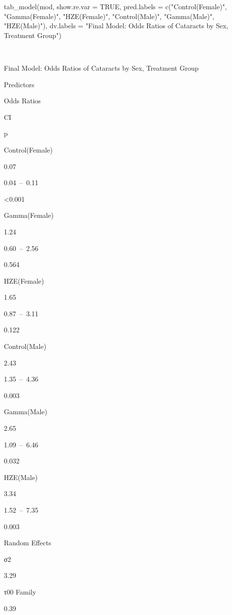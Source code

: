 \documentclass[
]{article}
\newenvironment{Shaded}{\begin{snugshade}}{\end{snugshade}}
\newcommand{\AttributeTok}[1]{\textcolor[rgb]{0.77,0.63,0.00}{#1}}
\newcommand{\ConstantTok}[1]{\textcolor[rgb]{0.00,0.00,0.00}{#1}}
\newcommand{\FunctionTok}[1]{\textcolor[rgb]{0.00,0.00,0.00}{#1}}
\newcommand{\NormalTok}[1]{#1}
\newcommand{\StringTok}[1]{\textcolor[rgb]{0.31,0.60,0.02}{#1}}
\begin{document}
\begin{Shaded}
\begin{Highlighting}[]
\FunctionTok{tab\_model}\NormalTok{(mod, }\AttributeTok{show.re.var =} \ConstantTok{TRUE}\NormalTok{,}
          \AttributeTok{pred.labels =} \FunctionTok{c}\NormalTok{(}\StringTok{"Control(Female)"}\NormalTok{, }\StringTok{"Gamma(Female)"}\NormalTok{, }\StringTok{"HZE(Female)"}\NormalTok{,}
                          \StringTok{"Control(Male)"}\NormalTok{, }\StringTok{"Gamma(Male)"}\NormalTok{, }\StringTok{"HZE(Male)"}\NormalTok{),}
          \AttributeTok{dv.labels =} \StringTok{"Final Model: Odds Ratios of Cataracts by Sex, Treatment Group"}\NormalTok{)}
\end{Highlighting}
\end{Shaded}

~

Final Model: Odds Ratios of Cataracts by Sex, Treatment Group

Predictors

Odds Ratios

CI

p

Control(Female)

0.07

0.04~--~0.11

\textless0.001

Gamma(Female)

1.24

0.60~--~2.56

0.564

HZE(Female)

1.65

0.87~--~3.11

0.122

Control(Male)

2.43

1.35~--~4.36

0.003

Gamma(Male)

2.65

1.09~--~6.46

0.032

HZE(Male)

3.34

1.52~--~7.35

0.003

Random Effects

σ2

3.29

τ00 Family

0.39
\end{document}
